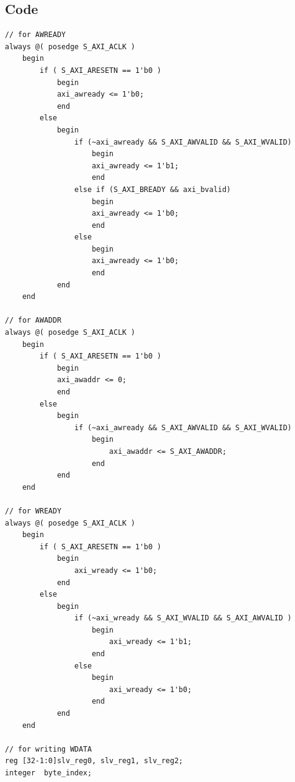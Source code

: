 \documentclass{article}
\begin{document}
\subsection{Code}
\begin{verbatim}
// for AWREADY
always @( posedge S_AXI_ACLK )
    begin
        if ( S_AXI_ARESETN == 1'b0 )
            begin
            axi_awready <= 1'b0;
            end 
        else
            begin    
                if (~axi_awready && S_AXI_AWVALID && S_AXI_WVALID)
                    begin
                    axi_awready <= 1'b1;
                    end
                else if (S_AXI_BREADY && axi_bvalid)
                    begin
                    axi_awready <= 1'b0;
                    end
                else           
                    begin
                    axi_awready <= 1'b0;
                    end
            end 
    end 

// for AWADDR
always @( posedge S_AXI_ACLK )
    begin
        if ( S_AXI_ARESETN == 1'b0 )
            begin
            axi_awaddr <= 0;
            end 
        else
            begin    
                if (~axi_awready && S_AXI_AWVALID && S_AXI_WVALID)
                    begin
                        axi_awaddr <= S_AXI_AWADDR;
                    end
            end 
    end       

// for WREADY
always @( posedge S_AXI_ACLK )
    begin
        if ( S_AXI_ARESETN == 1'b0 )
            begin
                axi_wready <= 1'b0;
            end 
        else
            begin    
                if (~axi_wready && S_AXI_WVALID && S_AXI_AWVALID )
                    begin
                        axi_wready <= 1'b1;
                    end
                else
                    begin
                        axi_wready <= 1'b0;
                    end
            end 
    end       
	
// for writing WDATA
reg [32-1:0]slv_reg0, slv_reg1, slv_reg2;
integer	 byte_index;


\end{verbatim}
\end{document}
